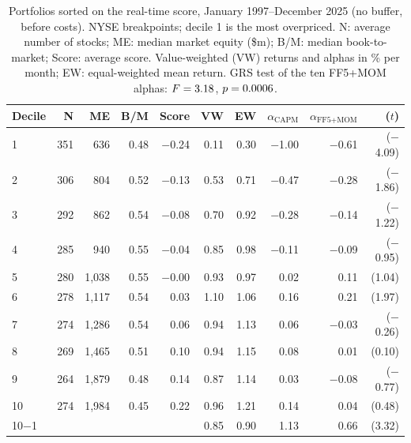 \documentclass[12pt,a4paper]{article}
\begin{document}
\begin{singlespace}
\begin{table}[!htbp]\centering
\caption{Portfolios sorted on the real-time score, January 1997--December 2025 (no buffer, before costs). NYSE breakpoints; decile 1 is the most overpriced. N: average number of stocks; ME: median market equity (\$m); B/M: median book-to-market; Score: average score. Value-weighted (VW) returns and alphas in \% per month; EW: equal-weighted mean return. GRS test of the ten FF5+MOM alphas: $F=3.18$, $p=0.0006$.}\label{tab:deciles}
\footnotesize
\begin{tabular}{lrrrrrrrrr}\toprule
Decile & N & ME & B/M & Score & VW & EW & $\alpha_{\text{CAPM}}$ & $\alpha_{\text{FF5+MOM}}$ & ($t$)\\\midrule
1 & 351 & 636 & 0.48 & \ensuremath{-}0.24 & 0.11 & 0.30 & \ensuremath{-}1.00 & \ensuremath{-}0.61 & (\ensuremath{-}4.09)\\
2 & 306 & 804 & 0.52 & \ensuremath{-}0.13 & 0.53 & 0.71 & \ensuremath{-}0.47 & \ensuremath{-}0.28 & (\ensuremath{-}1.86)\\
3 & 292 & 862 & 0.54 & \ensuremath{-}0.08 & 0.70 & 0.92 & \ensuremath{-}0.28 & \ensuremath{-}0.14 & (\ensuremath{-}1.22)\\
4 & 285 & 940 & 0.55 & \ensuremath{-}0.04 & 0.85 & 0.98 & \ensuremath{-}0.11 & \ensuremath{-}0.09 & (\ensuremath{-}0.95)\\
5 & 280 & 1,038 & 0.55 & \ensuremath{-}0.00 & 0.93 & 0.97 & 0.02 & 0.11 & (1.04)\\
6 & 278 & 1,117 & 0.54 & 0.03 & 1.10 & 1.06 & 0.16 & 0.21 & (1.97)\\
7 & 274 & 1,286 & 0.54 & 0.06 & 0.94 & 1.13 & 0.06 & \ensuremath{-}0.03 & (\ensuremath{-}0.26)\\
8 & 269 & 1,465 & 0.51 & 0.10 & 0.94 & 1.15 & 0.08 & 0.01 & (0.10)\\
9 & 264 & 1,879 & 0.48 & 0.14 & 0.87 & 1.14 & 0.03 & \ensuremath{-}0.08 & (\ensuremath{-}0.77)\\
10 & 274 & 1,984 & 0.45 & 0.22 & 0.96 & 1.21 & 0.14 & 0.04 & (0.48)\\
\midrule
10$-$1 & & & & & 0.85 & 0.90 & 1.13 & 0.66 & (3.32)\\
\bottomrule\end{tabular}
\end{table}


\end{singlespace}
\end{document}
